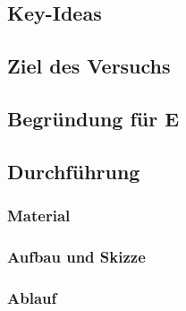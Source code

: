 

\subsection*{Key-Ideas}




\subsection*{Ziel des Versuchs}




\subsection*{Begründung für E}




\subsection*{Durchführung}

\subsubsection*{Material}




\subsubsection*{Aufbau und Skizze}




\subsubsection*{Ablauf}




